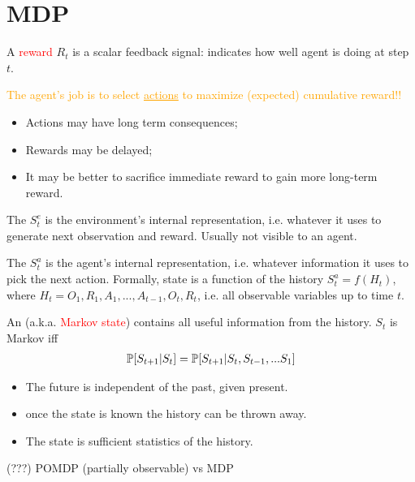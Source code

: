 \section{MDP}

A \textcolor{red}{reward} $R_t$ is a scalar feedback signal: indicates how well agent is doing at step $t$.

\textcolor{orange}{The agent’s job is to select \underline{actions} to maximize (expected) cumulative reward!!}
\begin{itemize}
	\item Actions may have long term consequences;
	\item Rewards may be delayed;
	\item It may be better to sacrifice immediate reward to gain more long-term reward.
\end{itemize}

The  $S^e_t$ is the environment's internal representation, i.e. whatever it uses to generate next observation and reward. Usually not visible to an agent.

The  $S^a_t$ is the agent's internal representation, i.e. whatever information it uses to pick the next action. Formally, state is a function of the history $S^a_t = f(H_t)$, where $H_t = O_1, R_1, A_1, ..., A_{t-1}, O_{t}, R_{t}$, i.e. all observable variables up to time $t$.

An  (a.k.a. \textcolor{red}{Markov state}) contains all useful information from the history. $S_t$ is Markov iff
\begin{align*}
\mathbb{P} [S_{t+1}|S_t]	= \mathbb{P}[S_{t+1}| S_t, S_{t-1}, ... S_1]
\end{align*}
\begin{itemize}
	\item The future is independent of the past, given present.
	\item once the state is known the history can be thrown away.
	\item The state is sufficient statistics of the history.
\end{itemize}


(???) POMDP (partially observable) vs MDP


